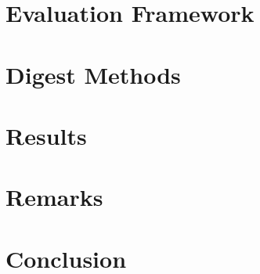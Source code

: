 \documentclass[]{article}
\begin{document}
\section{Evaluation Framework}


\section{Digest Methods}


\section{Results}


\section{Remarks}


\section{Conclusion}


\printbibliography
\end{document}

